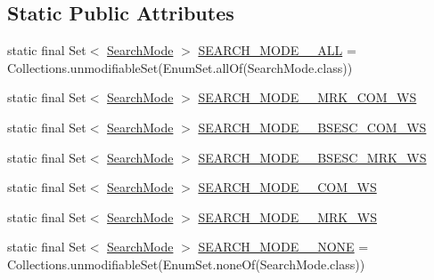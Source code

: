 \subsection*{Static Public Attributes}
\begin{DoxyCompactItemize}
\item 
static final Set$<$ \mbox{\hyperlink{enumcom_1_1mysql_1_1jdbc_1_1_string_utils_1_1_search_mode}{Search\+Mode}} $>$ \mbox{\hyperlink{classcom_1_1mysql_1_1jdbc_1_1_string_utils_ae7d013953cfc589d4a336aae1cad3e15}{S\+E\+A\+R\+C\+H\+\_\+\+M\+O\+D\+E\+\_\+\+\_\+\+A\+LL}} = Collections.\+unmodifiable\+Set(Enum\+Set.\+all\+Of(Search\+Mode.\+class))
\item 
static final Set$<$ \mbox{\hyperlink{enumcom_1_1mysql_1_1jdbc_1_1_string_utils_1_1_search_mode}{Search\+Mode}} $>$ \mbox{\hyperlink{classcom_1_1mysql_1_1jdbc_1_1_string_utils_a866b8f1784ccb509241bd1e090006dfb}{S\+E\+A\+R\+C\+H\+\_\+\+M\+O\+D\+E\+\_\+\+\_\+\+M\+R\+K\+\_\+\+C\+O\+M\+\_\+\+WS}}
\item 
static final Set$<$ \mbox{\hyperlink{enumcom_1_1mysql_1_1jdbc_1_1_string_utils_1_1_search_mode}{Search\+Mode}} $>$ \mbox{\hyperlink{classcom_1_1mysql_1_1jdbc_1_1_string_utils_afb4d834a01668b926398485a5b2e97f8}{S\+E\+A\+R\+C\+H\+\_\+\+M\+O\+D\+E\+\_\+\+\_\+\+B\+S\+E\+S\+C\+\_\+\+C\+O\+M\+\_\+\+WS}}
\item 
static final Set$<$ \mbox{\hyperlink{enumcom_1_1mysql_1_1jdbc_1_1_string_utils_1_1_search_mode}{Search\+Mode}} $>$ \mbox{\hyperlink{classcom_1_1mysql_1_1jdbc_1_1_string_utils_a7d38fa41256662257907064dd0b950b5}{S\+E\+A\+R\+C\+H\+\_\+\+M\+O\+D\+E\+\_\+\+\_\+\+B\+S\+E\+S\+C\+\_\+\+M\+R\+K\+\_\+\+WS}}
\item 
static final Set$<$ \mbox{\hyperlink{enumcom_1_1mysql_1_1jdbc_1_1_string_utils_1_1_search_mode}{Search\+Mode}} $>$ \mbox{\hyperlink{classcom_1_1mysql_1_1jdbc_1_1_string_utils_ad7e062e4d813140127bb184c5e040cc6}{S\+E\+A\+R\+C\+H\+\_\+\+M\+O\+D\+E\+\_\+\+\_\+\+C\+O\+M\+\_\+\+WS}}
\item 
static final Set$<$ \mbox{\hyperlink{enumcom_1_1mysql_1_1jdbc_1_1_string_utils_1_1_search_mode}{Search\+Mode}} $>$ \mbox{\hyperlink{classcom_1_1mysql_1_1jdbc_1_1_string_utils_af6d3d63373df472a5518bd7dcc2ebcb7}{S\+E\+A\+R\+C\+H\+\_\+\+M\+O\+D\+E\+\_\+\+\_\+\+M\+R\+K\+\_\+\+WS}}
\item 
static final Set$<$ \mbox{\hyperlink{enumcom_1_1mysql_1_1jdbc_1_1_string_utils_1_1_search_mode}{Search\+Mode}} $>$ \mbox{\hyperlink{classcom_1_1mysql_1_1jdbc_1_1_string_utils_a358b0534d95ad61de34282abee33205a}{S\+E\+A\+R\+C\+H\+\_\+\+M\+O\+D\+E\+\_\+\+\_\+\+N\+O\+NE}} = Collections.\+unmodifiable\+Set(Enum\+Set.\+none\+Of(Search\+Mode.\+class))
\end{DoxyCompactItemize}



